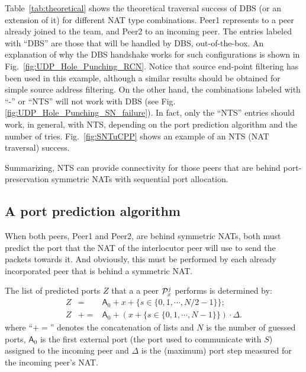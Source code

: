 Table~\ref{tab:theoretical} shows the theoretical traversal success of
DBS (or an extension of it) for different NAT type combinations. Peer1
represents to a peer already joined to the team, and Peer2 to an
incoming peer. The entries labeled with ``DBS'' are those that will be
handled by DBS, out-of-the-box. An explanation of why the DBS
handshake works for such configurations is shown in
Fig.~\ref{fig:UDP_Hole_Punching_RCN}.  Notice that source end-point
filtering has been used in this example, although a similar results
should be obtained for simple source address filtering. On the other
hand, the combinations labeled with ``-'' or ``NTS'' will not work
with DBS (see Fig.\ref{fig:UDP_Hole_Punching_SN_failure}). In fact,
only the ``NTS'' entries should work, in general, with NTS, depending
on the port prediction algorithm and the number of
tries. Fig.~\ref{fig:SNTuCPP} shows an example of an NTS (NAT
traversal) success.

Summarizing, NTS can provide connectivity for those peers that are
behind port-preservation symmetric NATs with sequential port
allocation.

\subsection{A port prediction algorithm}
When both peers, Peer1 and Peer2, are behind symmetric NATs, both must
predict the port that the NAT of the interlocutor peer will use to
send the packets towards it. And obviously, this must be performed by
each already incorporated peer that is behind a symmetric NAT.

The list of predicted ports $Z$ that a a peer ${\cal P}^j_x$ performs
is determined by:
\begin{equation}
  \begin{array}{rcl}
    Z & = & \textsf{A}_0 + x + \{s\in\{0,1,\cdots,N/2-1\}\}; \\
    Z & += & \textsf{A}_0 + (x + \{s\in\{0,1,\cdots, N-1\}\}) \cdot \Delta.
  \end{array}
\end{equation}
where ``$+=$'' denotes the concatenation of lists and $N$ is the
number of guessed ports, $\textsf{A}_0$ is the first external port (the
port used to communicate with $S$) assigned to the incoming peer and
$\Delta$ is the (maximum) port step measured for the incoming peer's
NAT.
